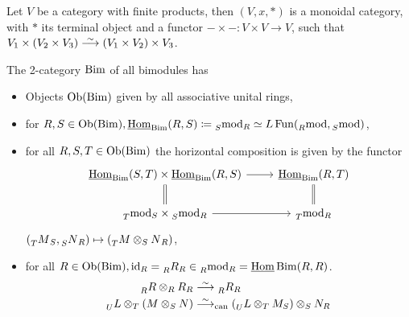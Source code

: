 \begin{exmp}
	Let $ V $ be a category with finite products, then $ ( V , x , * ) $ is a monoidal category, with $ * $ its terminal object and a functor $ - \times - \colon V \times V \to V $, such that $ V_1 \times ( V_2 \times V_3 ) \isomorphism ( V_1 \times V_2 ) \times V_3$.
\end{exmp}

\begin{exmp}	
	The 2-category $\operatorname{Bim}$ of all bimodules has 
	\begin{itemize}
		\item 
		Objects $ \operatorname{Ob} ( \operatorname{Bim} ) $ given by all associative unital rings,
		
		\item 
		for $ R , S \in \operatorname{Ob} ( \operatorname{Bim} ), \operatorname{\underline{Hom}}_{\operatorname{Bim}} ( R , S ) \coloneqq \prescript{}{S}{\operatorname{mod}}_R \simeq L \operatorname{Fun} ( \prescript{}{R}{\operatorname{mod}}, \prescript{}{S}{\operatorname{mod}})$,
		
		\item 
		for all $ R , S , T \in \operatorname{Ob} ( \operatorname{Bim} ) $ the horizontal composition is given by the functor 
		\[
		\begin{tikzcd}
			\twoHom_{ \Bim } ( S , T ) \times \twoHom_{ \Bim } ( R , S )
			\ar[r]
			\ar[d, equal]
			&
			\twoHom_{ \Bim } ( R , T )
			\ar[d, equal]
			\\
			\prescript{}{ T }{ \Mod }_S \times \prescript{}{ S }{ \Mod }_R
			\ar[r]
			&
			\prescript{}{ T }{ \Mod }_R 
		\end{tikzcd}
		\] 
		$ ( \prescript{}{ T }{ M }_S , \prescript{}{ S }{ N }_R ) \mapsto (\prescript{}{ T }{ M \otimes_S N }_R ) $,
		
		\item 
		for all $ R \in \operatorname{Ob} ( \operatorname{Bim} ), \operatorname{id}_R = \prescript{}{R}{R}_R \in \prescript{}{R}{\operatorname{mod}}_R=\operatorname{\underline{Hom}}{\operatorname{Bim}}( R , R )$.
		\begin{align*}
			\prescript{}{R}{R} \otimes_R R_R 
			&\isomorphism 
			\prescript{}{R}{R}_R
			\\
			\prescript{}{U}{L} \otimes_T ( M \otimes_S N )
			&\isomorphism_{\can}
			( \prescript{}{U}{L} \otimes_T M_S ) \otimes_S N_R
		\end{align*}
	\end{itemize}
\end{exmp}

